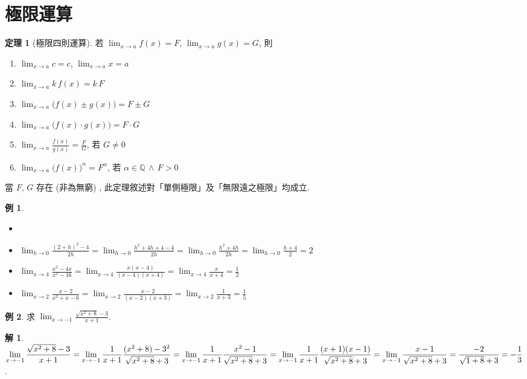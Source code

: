 \documentclass[12pt,a4paper]{extarticle}
\newcommand{\ds}{\displaystyle}
\theoremstyle{definition}
\newtheorem*{thm}{定理}
\newtheorem*{ex}{例}
\newtheorem*{sol}{解}
\begin{document}
\section*{極限運算}

\begin{thm}[極限四則運算]
  若 $\ds\lim_{x\to a}f(x) = F$, $\ds\lim_{x\to a}g(x) = G$, 則
  \begin{multicols}{2}
    \begin{enumerate}\setlength\itemsep{0em}
      \item $\ds\lim_{x\to a} c = c$, $\ds\lim_{x\to a} x = a$
      \item $\ds\lim_{x\to a} k\,f(x) = k\,F$ 
      \item $\ds\lim_{x\to a} \big(f(x)\pm g(x)\big) = F\pm G$ 
      \item $\ds\lim_{x\to a} \big(f(x)\cdot g(x)\big) = F\cdot G$ 
      \item $\ds\lim_{x\to a} \frac{f(x)}{g(x)} = \frac{F}{G}$, 若 $G\ne 0$
      \item $\ds\lim_{x\to a} \big(f(x)\big)^\alpha = F^\alpha$, 若 $\alpha\in\mathbb{Q}\,\wedge\,F > 0$
    \end{enumerate}
  \end{multicols}
  當 $F$, $G$ 存在 (非為無窮) , 此定理敘述對「單側極限」及「無限遠之極限」均成立. 
\end{thm}

\begin{ex}
  \begin{itemize}\setlength\itemsep{0em}
    \item[]
    \item $\ds\lim_{h\to0}\frac{(2 + h)^2 - 4}{2 h} = \lim_{h\to0}\frac{h^2 + 4h + 4 - 4}{2 h} = \lim_{h\to0}\frac{h^2 + 4h}{2 h} =\lim_{h\to0}\frac{h + 4}{2} = 2$
    \item $\ds\lim_{x\to4}\frac{x^2 - 4x}{x^2 - 16} = \lim_{x\to4}\frac{x(x - 4)}{(x - 4)(x + 4)} = \lim_{x\to4}\frac{x}{x + 4} = \frac{1}{2}$
    \item $\ds\lim_{x\to 2}\frac{x - 2}{x^2 + x - 6} = \lim_{x\to 2}\frac{x - 2}{(x - 2)(x + 3)} = \lim_{x\to2}\frac{1}{x + 3} = \frac{1}{5}$
  \end{itemize}
\end{ex}

\begin{ex}
  求 $\ds\lim_{x\to-1}\frac{\sqrt{x^2 + 8} - 3}{x + 1}$. 
\end{ex}

\begin{sol}
  $\ds\lim_{x\to-1}\frac{\sqrt{x^2 + 8} - 3}{x + 1} = \lim_{x\to-1}\frac{1}{x + 1}\frac{(x^2 + 8) - 3^2}{\sqrt{x^2 + 8} + 3} = \lim_{x\to-1}\frac{1}{x + 1}\frac{x^2 - 1}{\sqrt{x^2 + 8} + 3} \\= \lim_{x\to-1}\frac{1}{x + 1}\frac{(x + 1)(x - 1)}{\sqrt{x^2 + 8} + 3} =\lim_{x\to-1}\frac{x - 1}{\sqrt{x^2 + 8} + 3} = \frac{-2}{\sqrt{1 + 8} + 3} = -\frac{1}{3}$. 
\end{sol}
\end{document}
